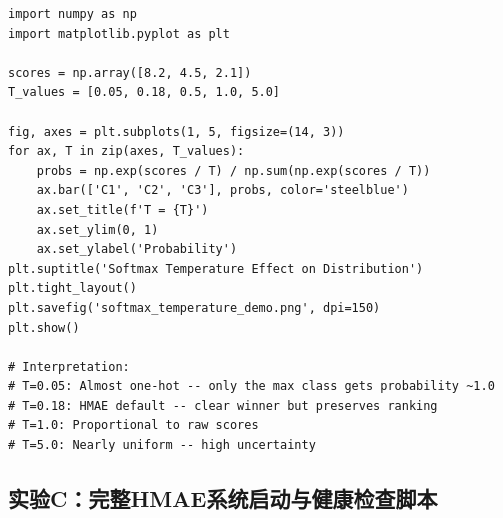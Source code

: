 \documentclass[11pt,a4paper]{ctexart}
\begin{document}
\begin{verbatim}
import numpy as np
import matplotlib.pyplot as plt

scores = np.array([8.2, 4.5, 2.1])
T_values = [0.05, 0.18, 0.5, 1.0, 5.0]

fig, axes = plt.subplots(1, 5, figsize=(14, 3))
for ax, T in zip(axes, T_values):
    probs = np.exp(scores / T) / np.sum(np.exp(scores / T))
    ax.bar(['C1', 'C2', 'C3'], probs, color='steelblue')
    ax.set_title(f'T = {T}')
    ax.set_ylim(0, 1)
    ax.set_ylabel('Probability')
plt.suptitle('Softmax Temperature Effect on Distribution')
plt.tight_layout()
plt.savefig('softmax_temperature_demo.png', dpi=150)
plt.show()

# Interpretation:
# T=0.05: Almost one-hot -- only the max class gets probability ~1.0
# T=0.18: HMAE default -- clear winner but preserves ranking
# T=1.0: Proportional to raw scores
# T=5.0: Nearly uniform -- high uncertainty
\end{verbatim}

\subsection*{实验C：完整HMAE系统启动与健康检查脚本}
\end{document}
